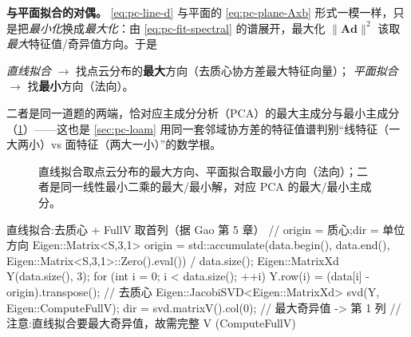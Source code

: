 \noindent\textbf{与平面拟合的对偶。} \cref{eq:pc-line-d} 与平面的 \cref{eq:pc-plane-Axb} 形式一模一样，只是把\emph{最小化}换成\emph{最大化}：由 \cref{eq:pc-fit-spectral} 的谱展开，最大化 $\|\mathbf{A}\mathbf{d}\|^2$ 该取\emph{最大}特征值/奇异值方向。于是
\begin{center}\small
\emph{直线拟合} $\to$ 找点云分布的\textbf{最大}方向（去质心协方差最大特征向量）；\quad
\emph{平面拟合} $\to$ 找\textbf{最小}方向（法向）。
\end{center}
二者是同一道题的两端，恰对应主成分分析（PCA）的最大主成分与最小主成分（\cref{fig:pc-fit-dual}）——这也是 \cref{sec:pc-loam} 用同一套邻域协方差的特征值谱判别“线特征（一大两小）vs 面特征（两大一小）”的数学根。

\begin{figure}[H]\centering
{}
\caption{直线拟合取点云分布的最大方向、平面拟合取最小方向（法向）；二者是同一线性最小二乘的最大/最小解，对应 PCA 的最大/最小主成分。}
\label{fig:pc-fit-dual}
\end{figure}

\begin{codebox}[C++]{直线拟合:去质心 + FullV 取首列（据 Gao 第 5 章）}
// origin = 质心;dir = 单位方向
Eigen::Matrix<S,3,1> origin =
    std::accumulate(data.begin(), data.end(),
                    Eigen::Matrix<S,3,1>::Zero().eval()) / data.size();
Eigen::MatrixXd Y(data.size(), 3);
for (int i = 0; i < data.size(); ++i)
  Y.row(i) = (data[i] - origin).transpose();        // 去质心
Eigen::JacobiSVD<Eigen::MatrixXd> svd(Y, Eigen::ComputeFullV);
dir = svd.matrixV().col(0);                          // 最大奇异值 -> 第 1 列
// 注意:直线拟合要最大奇异值，故需完整 V (ComputeFullV)
\end{codebox}

